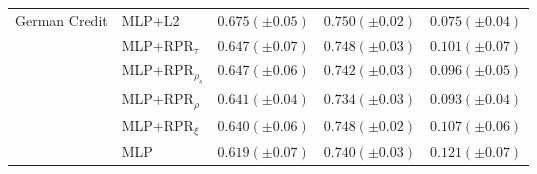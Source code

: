 \begin{tabular}{lllll}
\multirow[t]{6}{*}{German Credit} & MLP+L2 & $0.675 (\pm0.05)$ & $0.750 (\pm0.02)$ & $0.075 (\pm0.04)$ \\
 & MLP+RPR$_{\tau}$ & $0.647 (\pm0.07)$ & $0.748 (\pm0.03)$ & $0.101 (\pm0.07)$ \\
 & MLP+RPR$_{\rho_s}$ & $0.647 (\pm0.06)$ & $0.742 (\pm0.03)$ & $0.096 (\pm0.05)$ \\
 & MLP+RPR$_{\rho}$ & $0.641 (\pm0.04)$ & $0.734 (\pm0.03)$ & $0.093 (\pm0.04)$ \\
 & MLP+RPR$_{\xi}$ & $0.640 (\pm0.06)$ & $0.748 (\pm0.02)$ & $0.107 (\pm0.06)$ \\
 & MLP & $0.619 (\pm0.07)$ & $0.740 (\pm0.03)$ & $0.121 (\pm0.07)$ \\
\cline{1-5}
\bottomrule
\end{tabular}
